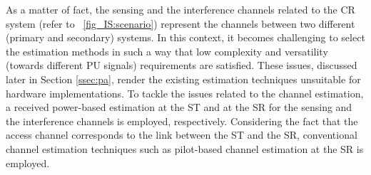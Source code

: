 As a matter of fact, the sensing and the interference channels related to the CR system (refer to \figurename~\ref{fig_IS:scenario}) represent the channels between two different (primary and secondary) systems. In this context, it becomes challenging to select the estimation methods in such a way that low complexity and versatility (towards different PU signals) requirements are satisfied. These issues, discussed later in Section \ref{ssec:pa}, render the existing estimation techniques \cite{Stoica03, Gifford05, Gifford08, Chav11, Sharma13} unsuitable for hardware implementations. 
To tackle the issues related to the channel estimation, a received power-based estimation at the ST and at the SR for the sensing and the interference channels is employed, respectively.
Considering the fact that the access channel corresponds to the link between the ST and the SR, conventional channel estimation techniques such as pilot-based channel estimation at the SR is employed.

